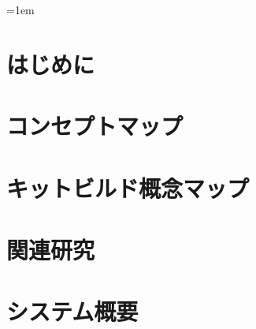 \addtolength{\headsep}{1cm}
\addtolength{\topmargin}{-2cm}
\addtolength{\textheight}{2cm}


\addtolength{\oddsidemargin}{-1.0cm}
\addtolength{\evensidemargin}{-3.6cm}
\addtolength{\textwidth}{5.5cm}



%
%


%
%


%
%


\setlength{\baselineskip}{1.2\baselineskip}

\pagestyle{plain}
\tableofcontents


\parindent=1em

\clearpage
\pagestyle{headings}

%
%
\chapter{はじめに}
\label{chap:introduction}


%
%
\chapter{コンセプトマップ}
\label{chap:conceptmap}


%
%
\chapter{キットビルド概念マップ}
\label{chap:kitbuild}


%
%
\chapter{関連研究}
\label{chap:refer}


%
%
\chapter{システム概要}
\label{chap:content}


